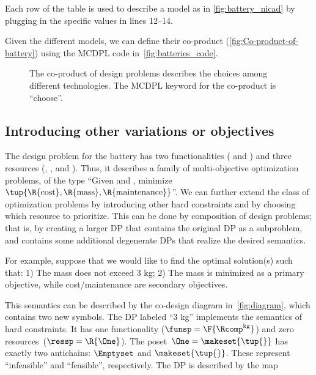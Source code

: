 \begin{figure*}[p]
Each row of the table is used to describe a model as in \cref{fig:battery_nicad} by plugging in the specific values in lines 12--14.

Given the different models, we can define their co-product (\cref{fig:Co-product-of-battery}) using the MCDPL code in~\cref{fig:batteries_code}.

\begin{figure}[h]

    \caption{
        The co-product of design problems describes the choices among different technologies.
        The MCDPL keyword for the co-product is ``choose''.
    }
    \label{fig:batteriesbig}
\end{figure}

\subsection{Introducing other variations or objectives}

The design problem for the battery has two functionalities ( and ) and three resources (, , and ).
Thus, it describes a family of multi-objective optimization problems, of the type ``Given  and , minimize $\tup{ \R{\text{cost}},\R{\text{mass}},\R{\text{maintenance}}} $''.
We can further extend the class of optimization problems by introducing other hard constraints and by choosing which resource to prioritize.
This can be done by composition of design problems; that is, by creating a larger DP that contains the original DP as a subproblem, and contains some additional degenerate DPs that realize the desired semantics.

For example, suppose that we would like to find the optimal solution(s) such that: 1) The mass does not exceed 3 kg; 2) The mass is minimized as a primary objective, while cost/maintenance are secondary objectives.

This semantics can be described by the co-design diagram in~\cref{fig:diagram}, which contains two new symbols.
The DP labeled ``3 kg'' implements the semantics of hard constraints.
It has one functionality ($\funsp=\F{\Rcomp^{\text{kg}}}$) and zero resources~($\ressp=\R{\One}$).
The poset~$\One=\makeset{\tup{ } }$ has exactly two antichains: $\Emptyset$ and $\makeset{\tup{ } }$.
These represent ``infeasible'' and ``feasible'', respectively.
The DP is described by the map


\end{figure*}
